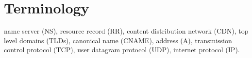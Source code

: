 \section{Terminology}
name server (NS), resource record (RR), content distribution network
(CDN), top level domains (TLDs), canonical name (CNAME), address (A),
transmission control protocol (TCP), user datagram protocol (UDP),
internet protocol (IP).